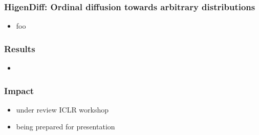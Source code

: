 \documentclass[./presentation.tex]{subfiles}
\begin{document}
\begin{frame}[label=working]
  \frametitle{HigenDiff: Ordinal diffusion towards arbitrary distributions}
  \begin{itemize}
    \item foo
  \end{itemize}
\end{frame}

\begin{frame}[label=working]
  \frametitle{Results}
  \begin{itemize}
    \item
  \end{itemize}
\end{frame}

\begin{frame}[label=working]
  \frametitle{Impact}
  \begin{itemize}
    \item under review ICLR workshop
    \item being prepared for presentation
  \end{itemize}
\end{frame}
\end{document}
